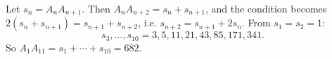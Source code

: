 Let $s_n=A_nA_{n+1}$. Then $A_nA_{n+2}=s_n+s_{n+1}$, and the condition becomes $2(s_n+s_{n+1})=s_{n+1}+s_{n+2}$, i.e. $s_{n+2}=s_{n+1}+2s_n$. From $s_1=s_2=1$:
\[s_3,\dots,s_{10}=3,5,11,21,43,85,171,341.\]
So $A_1A_{11}=s_1+\cdots+s_{10}=\boxed{682}$.
